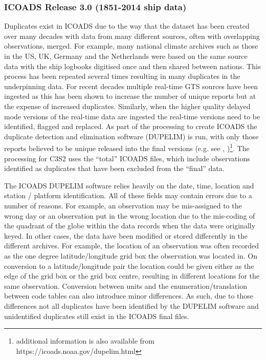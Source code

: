 {\subsubsection{ICOADS Release 3.0 (1851-2014 ship data)} \label{ship-dupelim}
Duplicates exist in ICOADS due to the way that the dataset has been created over many decades with data from many different sources, often with overlapping observations, merged. 
For example, many national climate archives such as those in the US, UK, Germany and the Netherlands were based on the same source data with the ship logbooks digitised once and then shared between nations. 
This process has been repeated several times resulting in many duplicates in the underpinning data. 
For recent decades multiple real-time GTS sources have been ingested as this has been shown to increase the number of unique reports but at the expense of increased duplicates. 
Similarly, when the higher quality delayed mode versions of the real-time data are ingested the real-time versions need to be identified, flagged and replaced. 
As part of the processing to create ICOADS the duplicate detection and elimination software (DUPELIM) is run, with only those reports believed to be unique released into the final versions (e.g. see \cite{Freeman2017}, \cite{Woodruff2011})\footnote{additional information is also available from https://icoads.noaa.gov/dupelim.html}. The processing for C3S2 uses the ``total'' ICOADS files, which include observations identified as duplicates that have been excluded from the ``final'' data.

The ICOADS DUPELIM software relies heavily on the date, time, location and station / platform identification. 
All of these fields may contain errors due to a number of reasons. 
For example, an observation may be mis-assigned to the wrong day or an observation put in the wrong location due to the mis-coding of the quadrant of the globe within the data records when the data were originally keyed. 
In other cases, the data have been modified or stored differently in the different archives.
For example, the location of an observation was often recorded as the one degree latitude/longitude grid box the observation was located in.
On conversion to a latitude/longitude pair the location could be given either as the edge of the grid box or the grid box centre, resulting in different locations for the same observation.
Conversion between units and the enumeration/translation between code tables can also introduce minor differences.
As such, due to those differences not all duplicates have been identified by the DUPELIM software and unidentified duplicates still exist in the ICOADS final files.

}
